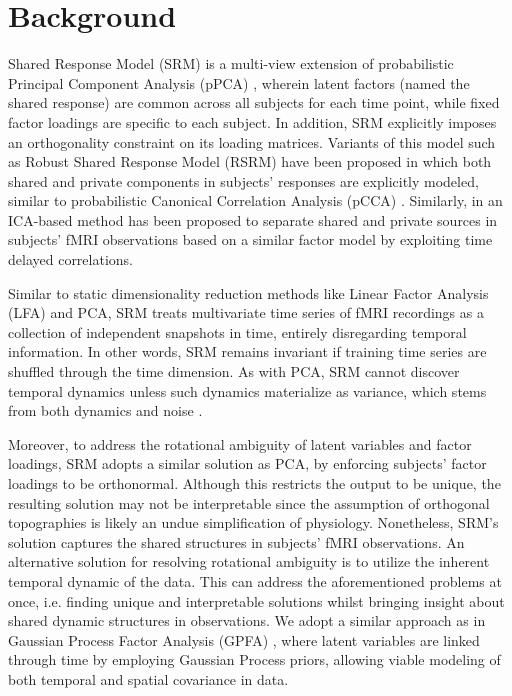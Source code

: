 \section{Background}

Shared Response Model (SRM) \cite{srm} is a multi-view extension of probabilistic Principal Component Analysis (pPCA) \cite{ppca}, wherein latent factors (named the shared response) are common across all subjects for each time point, while fixed factor loadings are specific to each subject. In addition, SRM explicitly imposes an orthogonality constraint on its loading matrices. Variants of this model such as Robust Shared Response Model (RSRM) \cite{rsrm} have been proposed in which both shared and private components in subjects' responses are explicitly modeled, similar to probabilistic Canonical Correlation Analysis (pCCA) \cite{pcca}. Similarly, in \cite{lukic2002ica} an ICA-based method has been proposed to separate shared and private sources in subjects' fMRI observations based on a similar factor model by exploiting time delayed correlations.

Similar to static dimensionality reduction methods like Linear Factor Analysis (LFA) and PCA, SRM treats multivariate time series of fMRI recordings as a collection of independent snapshots in time, entirely disregarding temporal information. In other words, SRM remains invariant if training time series are shuffled through the time dimension. As with PCA, SRM cannot discover temporal dynamics unless such dynamics materialize as variance, which stems from both dynamics and noise \cite{dca}. 

Moreover, to address the rotational ambiguity of latent variables and factor loadings, SRM adopts a similar solution as PCA, by enforcing subjects' factor loadings to be orthonormal. Although this restricts the output to be unique, the resulting solution may not be interpretable since the assumption of orthogonal topographies is likely an undue simplification of physiology. Nonetheless, SRM's solution captures the shared structures in subjects' fMRI observations. An alternative solution for resolving rotational ambiguity is to utilize the inherent temporal dynamic of the data. This can address the aforementioned problems at once, i.e. finding unique and interpretable solutions whilst bringing insight about shared dynamic structures in observations. We adopt a similar approach as in Gaussian Process Factor Analysis (GPFA) \cite{gpfa}, where latent variables are linked through time by employing Gaussian Process priors, allowing viable modeling of both temporal and spatial covariance in data.

